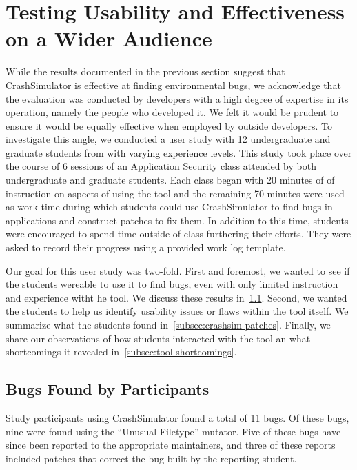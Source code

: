 \section{Testing Usability and Effectiveness on a Wider Audience}

While the results documented in the previous section suggest that CrashSimulator
is effective at finding environmental bugs, we acknowledge that the evaluation
was conducted by developers with a high degree of expertise in its operation,
namely the people who developed it.  We felt it would be prudent to ensure it
would be equally effective when employed by outside developers.
To investigate this angle,
we conducted a user study
with 12 undergraduate and graduate students from with varying experience levels.
This study took place over the course of 6  sessions
of an Application Security class attended by both undergraduate and graduate
students.  Each class began with 20
minutes of of instruction on aspects of using the tool
and the remaining 70 minutes were used as work time during which students could
use CrashSimulator to find bugs in applications and construct patches to fix
them.  In addition to this time, students were encouraged to spend time outside
of class furthering their efforts.  They were asked to record their progress
using a provided work log template.


Our goal for this user study was two-fold.  First and foremost,
we wanted to see if the students wereable to use it to find bugs,
even with only limited instruction and experience witht he tool.
We discuss these results in~\ref{subsec:bugs-by-participants}.
Second, we wanted the students to help us identify usability issues
or flaws within the tool itself.  We summarize what the students found
in~\ref{subsec:crashsim-patches}.  Finally, we share our observations
of how students interacted with the tool an what shortcomings
it revealed in~\ref{subsec:tool-shortcomings}.

\subsection{Bugs Found by Participants}
\label{subsec:bugs-by-participants}
Study participants using CrashSimulator found a total of 11 bugs.
Of these bugs, nine were found using the ``Unusual Filetype'' mutator.
Five of these bugs have since been reported to the appropriate maintainers,
and three of these reports included patches
that correct the bug
built by the reporting student.

